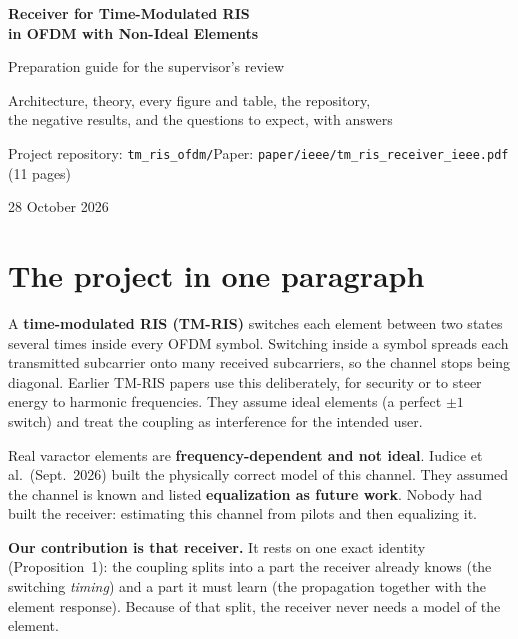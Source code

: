 \documentclass[11pt,a4paper]{article}
\begin{document}
\begin{titlepage}
\centering
\vspace*{3cm}
{\Huge\bfseries\color{cA} Receiver for Time-Modulated RIS\\[0.3em] in OFDM with Non-Ideal Elements\par}
\vspace{1cm}
{\Large Preparation guide for the supervisor's review\par}
\vspace{1.5cm}
{\large Architecture, theory, every figure and table, the repository,\\ the negative results, and the questions to expect, with answers\par}
\vfill
{\normalsize Project repository: \texttt{tm\_ris\_ofdm/}\quad Paper: \texttt{paper/ieee/tm\_ris\_receiver\_ieee.pdf} (11 pages)\par}
\vspace{0.5cm}
{\normalsize 28 October 2026\par}
\end{titlepage}

\tableofcontents
\newpage

\section{The project in one paragraph}
A \textbf{time-modulated RIS (TM-RIS)} switches each element between two states several times inside every OFDM symbol.
Switching inside a symbol spreads each transmitted subcarrier onto many received subcarriers, so the channel stops being
diagonal. Earlier TM-RIS papers use this deliberately, for security or to steer energy to harmonic frequencies. They
assume ideal elements (a perfect $\pm1$ switch) and treat the coupling as interference for the intended user.

Real varactor elements are \textbf{frequency-dependent and not ideal}. Iudice et al.\ (Sept.\ 2026) built the physically
correct model of this channel. They assumed the channel is known and listed \textbf{equalization as future work}. Nobody
had built the receiver: estimating this channel from pilots and then equalizing it.

\begin{keybox}
\textbf{Our contribution is that receiver.} It rests on one exact identity (Proposition~1): the coupling splits into a
part the receiver already knows (the switching \emph{timing}) and a part it must learn (the propagation together with the
element response). Because of that split, the receiver never needs a model of the element.
\end{keybox}
\end{document}
